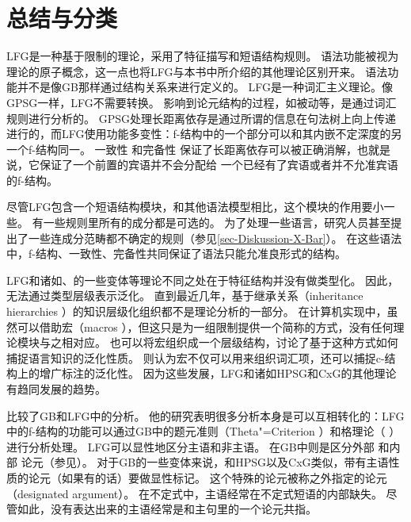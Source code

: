 \section{总结与分类}

LFG是一种基于限制的理论，采用了特征描写和短语结构规则。
语法功能被视为理论的原子概念，这一点也将LFG与本书中所介绍的其他理论区别开来。
语法功能并不是像GB那样通过结构关系来进行定义的。
LFG是一种词汇主义理论。像GPSG一样，LFG不需要转换。
影响到论元结构的过程，如被动等，是通过词汇规则进行分析的。
GPSG处理长距离依存是通过所谓的信息在句法树上向上传递进行的，而LFG使用功能多变性：f-结构中的一个部分可以和其内嵌不定深度的另一个f-结构同一。
一致性
和完备性
保证了长距离依存可以被正确消解，也就是说，它保证了一个前置的宾语并不会分配给
一个已经有了宾语或者并不允准宾语的f-结构。

尽管LFG包含一个短语结构模块，和其他语法模型相比，这个模块的作用要小一些。
有一些规则里所有的成分都是可选的。
为了处理一些语言，研究人员甚至提出了一些连成分范畴都不确定的规则（参见\ref{sec-Diskussion-X-Bar}）。
在这些语法中，f-结构、一致性、完备性共同保证了语法只能允准良形式的结构。

LFG和诸如\hpsgc、\cxgc 的一些变体等理论不同之处在于特征结构并没有做类型化。
因此，无法通过类型层级表示泛化。
直到最近几年，基于继承关系（inheritance hierarchies
）的知识层级化组织都不是理论分析的一部分。
在计算机实现中，虽然可以借助宏（macros
），但这只是为一组限制提供一个简称的方式，没有任何理论模块与之相对应。
也可以将宏组织成一个层级结构，讨论了基于这种方式如何捕捉语言知识的泛化性质。
\citet*{ADT2008a}则认为宏不仅可以用来组织词汇项，还可以捕捉c-结构上的增广标注的泛化性。
因为这些发展，LFG和诸如HPSG和CxG的其他理论有趋同发展的趋势。

\citet{Williams84a}比较了GB和LFG中的分析。
他的研究表明很多分析本身是可以互相转化的：LFG中的f-结构的功能可以通过GB中的题元准则（Theta"=Criterion
）和格理论（
）进行分析处理。
LFG可以显性地区分主语和非主语。
在GB中则是区分外部
和内部
论元（参见\citealp[\S~1.2]{Williams84a}）。
对于GB的一些变体来说，和HPSG\indexhpsgc 以及CxG\indexcxgc 类似，带有主语性质的论元（如果有的话）要做显性标记\citep{Haider86,HM94a,Mueller2003e,MR2001a}。
这个特殊的论元被称之外指定的论元（designated argument）。
在不定式中，主语经常在不定式短语的内部缺失。
尽管如此，没有表达出来的主语经常是和主句里的一个论元共指。

